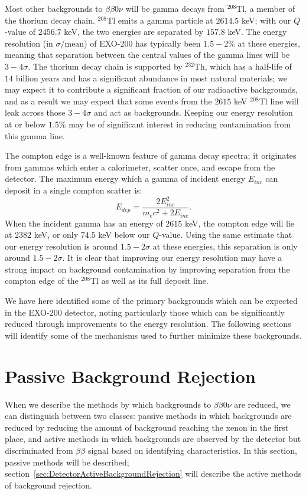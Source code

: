 Most other backgrounds to $\beta\beta 0\nu$ will be gamma decays from $^{208}$Tl, a member of the thorium decay chain.  $^{208}$Tl emits a gamma particle at $2614.5$ keV; with our $Q$-value of $2456.7$ keV, the two energies are separated by $157.8$ keV.  The energy resolution (in $\sigma/\text{mean}$) of EXO-200 has typically been $1.5-2\%$ at these energies, meaning that separation between the central values of the gamma lines will be $3-4\sigma$.  The thorium decay chain is supported by $^{232}$Th, which has a half-life of $14$ billion years and has a significant abundance in most natural materials; we may expect it to contribute a significant fraction of our radioactive backgrounds, and as a result we may expect that some events from the $2615$ keV $^{208}$Tl line will leak across those $3-4\sigma$ and act as backgrounds.  Keeping our energy resolution at or below $1.5\%$ may be of significant interest in reducing contamination from this gamma line.

The compton edge is a well-known feature of gamma decay spectra; it originates from gammas which enter a calorimeter, scatter once, and escape from the detector.  The maximum energy which a gamma of incident energy $E_{inc}$ can deposit in a single compton scatter is:
\begin{equation}
E_{dep} = \frac{2E_{inc}^2}{m_e c^2 + 2E_{inc}}.
\end{equation}
When the incident gamma has an energy of $2615$ keV, the compton edge will lie at $2382$ keV, or only $74.5$ keV below our $Q$-value.  Using the same estimate that our energy resolution is around $1.5-2\sigma$ at these energies, this separation is only around $1.5-2\sigma$.  It is clear that improving our energy resolution may have a strong impact on background contamination by improving separation from the compton edge of the $^{208}$Tl as well as its full deposit line.

We have here identified some of the primary backgrounds which can be expected in the EXO-200 detector, noting particularly those which can be significantly reduced through improvements to the energy resolution.  The following sections will identify some of the mechanisms used to further minimize these backgrounds.

\section{Passive Background Rejection}\label{sec:DetectorPassiveBackgroundRejection}

When we describe the methods by which backgrounds to $\beta\beta 0\nu$ are reduced, we can distinguish between two classes: passive methods in which backgrounds are reduced by reducing the amount of background reaching the xenon in the first place, and active methods in which backgrounds are observed by the detector but discriminated from $\beta\beta$ signal based on identifying characteristics.  In this section, passive methods will be described; section~\ref{sec:DetectorActiveBackgroundRejection} will describe the active methods of background rejection.

